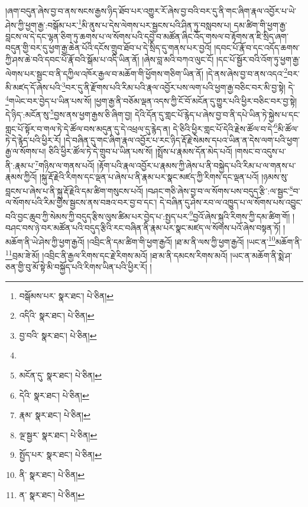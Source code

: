 །ཞག་བདུན་ཞེས་བྱ་བ་ནས་སངས་རྒྱས་ཉིད་ཐོབ་པར་འགྱུར་རོ་ཞེས་བྱ་བའི་བར་དུ་ནི་གང་ཞིག་རྣལ་འབྱོར་པ་ཡེ་ཤེས་ཀྱི་ཕྱག་རྒྱ་:བསྒོམ་པར་\footnote{བསྒོམས་པར་  སྣར་ཐང་།  པེ་ཅིན། }མི་ནུས་པ་དེས་ལེགས་པར་སྦྱངས་པའི་ཤིན་ཏུ་བསླབས་པ། དམ་ཚིག་གི་ཕྱག་རྒྱ་བླངས་ལ་དེ་དང་ལྷན་ཅིག་ཏུ་ཆགས་པ་ལ་སོགས་པའི་དབྱེ་བ་མཚོན་ཞིང་འོད་གསལ་བ་རྟོགས་ན་ཇི་སྲིད་ཞག་བདུན་གྱི་བར་དུ་ཕྱག་རྒྱ་ཆེན་པོའི་དངོས་གྲུབ་ཐོབ་པ་དེ་སྲིད་དུ་གནས་པར་བྱའོ། །དབང་པོ་རྣོ་བ་དང་འདོད་ཆགས་ཀྱི་ཤས་ཆེ་བའི་དབང་པོ་རྣོ་བའི་སྒོམ་པ་འདི་ཡིན་ནོ། །ཞེས་བླ་མའི་བཀའ་ལུང་ངོ། །དང་པོ་སྦྱོར་བའི་འོག་ཏུ་ཕྱག་རྒྱ་ལེགས་པར་སྦྱང་བ་ནི་དཀྱིལ་འཁོར་རྒྱལ་བ་མཆོག་གི་ཕྱོགས་གཅིག་ཡིན་ནོ། །དེ་ནས་ཞེས་བྱ་བ་ནས་འདའ་\footnote{འདིའི་  སྣར་ཐང་།  པེ་ཅིན། }བར་མི་མཛད་དོ་ཞེས་པའི་\footnote{བྱ་བའི་  སྣར་ཐང་།  པེ་ཅིན། }བར་དུ་ནི་རྫོགས་པའི་རིམ་པའི་རྣལ་འབྱོར་པས་ལག་པའི་ཕྱག་རྒྱ་བཅིང་བར་མི་བྱ་སྟེ། དེ་\footnote{}གཡེང་བར་བྱེད་པ་ཡིན་པས་སོ། །ཕྱག་རྒྱ་ནི་བཅོམ་ལྡན་འདས་ཀྱི་ངོ་བོ་མངོན་དུ་གྱུར་པའི་ཕྱིར་བཅིང་བར་བྱ་སྟེ། དེ་ཉིད་:མངོན་སུ་\footnote{མངོན་དུ་  སྣར་ཐང་།  པེ་ཅིན། }བྱས་ནས་ཕྱག་རྒྱས་ཅི་ཞིག་བྱ། དེའི་དོན་དུ་གླང་པོ་རྙེད་པ་ཞེས་བྱ་བ་ནི་དཔེ་ཡིན་ཏེ་སྐྱེས་པ་དང་གླང་པོ་སྟོར་བ་གལ་ཏེ་དེ་ཚོལ་བས་མདུན་དུ་དེ་འཕྲལ་དུ་རྙེད་ན། དེ་ཅིའི་ཕྱིར་གླང་པོ་དེའི་རྗེས་ཚོལ་བ་དེ་\footnote{དེའི་  སྣར་ཐང་།  པེ་ཅིན། }མི་ཚོལ་ཏེ་དེ་རྙེད་པའི་ཕྱིར་རོ། །དེ་བཞིན་དུ་གང་ཞིག་རྣལ་འབྱོར་པ་རང་ཉིད་རྡོ་རྗེ་སེམས་དཔའ་ཡིན་ན་དེས་ལག་པའི་ཕྱག་རྒྱ་ལ་སོགས་པ། ཅིའི་ཕྱིར་ཚོལ་ཏེ་དེ་གྲུབ་པ་ཡིན་པས་སོ། །སྤྲོས་པ་རྣམས་དོན་མེད་པའོ། །གསང་བ་འདུས་པ་ནི་:རྣམ་པ་\footnote{རྣམ་  སྣར་ཐང་།  པེ་ཅིན། }གཉིས་ལ་གནས་པའོ། །རྟོག་པའི་རྣལ་འབྱོར་པ་རྣམས་ཀྱི་ཞེས་པ་ནི་བསྐྱེད་པའི་རིམ་པ་ལ་གནས་པ་རྣམས་ཀྱིའོ། །སྐུ་རྡོ་རྗེའི་རིགས་དང་ལྡན་པ་ཞེས་པ་ནི་རྣམ་པར་སྣང་མཛད་ཀྱི་རིགས་དང་ལྡན་པའོ། །ཉམས་སུ་བླངས་པ་ཞེས་པ་ནི་སྐུ་རྡོ་རྗེའི་དམ་ཚིག་གསུངས་པའོ། །བཤང་གཅི་ཞེས་བྱ་བ་ལ་སོགས་པས་བདུད་རྩི་:ལ་སྦྱང་\footnote{ལྔ་སྦྱར་  སྣར་ཐང་།  པེ་ཅིན། }བ་ལ་སོགས་པའི་རིམ་གྱིས་སྦྱངས་ནས་བཟའ་བར་བྱ་བ་དང་། དེ་བཞིན་དུ་ཤེས་རབ་ལ་འཁྱུད་པ་ལ་སོགས་པས་འབྱུང་བའི་བྱང་ཆུབ་ཀྱི་སེམས་ཀྱི་བདུད་རྩིས་ལུས་ཚིམ་པར་བྱེད་པ་:སྤྱད་པར་\footnote{སྤྱོད་པར་  སྣར་ཐང་།  པེ་ཅིན། }བྱའོ་ཞེས་སྐུའི་རིགས་ཀྱི་དམ་ཚིག་གོ། །བཤང་བས་ཉེ་བར་མཚོན་པའི་བདུད་རྩིའི་རང་བཞིན་ནི་རྣམ་པར་སྣང་མཛད་ལ་སོགས་པའོ་ཞེས་བསྟན་ཏོ། །མཆོག་ནི་ཡེ་ཤེས་ཀྱི་ཕྱག་རྒྱའོ། །འབྲིང་ནི་དམ་ཚིག་གི་ཕྱག་རྒྱའོ། །ཐ་མ་ནི་ལས་ཀྱི་ཕྱག་རྒྱའོ། །ཡང་ན་\footnote{ནི་  སྣར་ཐང་།  པེ་ཅིན། }མཆོག་ནི་\footnote{ན་  སྣར་ཐང་།  པེ་ཅིན། }བྲམ་ཟེ་མོ། །འབྲིང་ནི་རྒྱལ་རིགས་དང་རྗེ་རིགས་མའོ། །ཐ་མ་ནི་དམངས་རིགས་མའོ། །ཡང་ན་མཆོག་ནི་སྨེ་ཤ་ཅན་གྱི་བུ་མོ་སྟེ་མི་བསྐྱོད་པའི་རིགས་ཡིན་པའི་ཕྱིར་རོ། །

